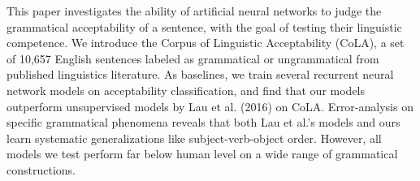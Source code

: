 This paper investigates the ability of artificial neural networks to judge the grammatical acceptability of a sentence, with the goal of testing their linguistic competence. We introduce the Corpus of Linguistic Acceptability (CoLA), a set of 10,657 English sentences labeled as grammatical or ungrammatical from published linguistics literature. As baselines, we train several recurrent neural network models on acceptability classification, and find that our models outperform unsupervised models by Lau et al. (2016) on CoLA. Error-analysis on specific grammatical phenomena reveals that both Lau et al.’s models and ours learn systematic generalizations like subject-verb-object order. However, all models we test perform far below human level on a wide range of grammatical constructions.